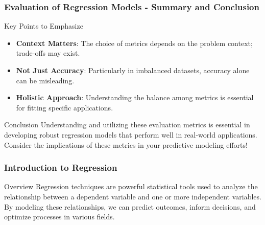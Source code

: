 \documentclass[aspectratio=169]{beamer}
\begin{document}
\begin{frame}[fragile]
    \frametitle{Evaluation of Regression Models - Summary and Conclusion}
    \begin{block}{Key Points to Emphasize}
        \begin{itemize}
            \item \textbf{Context Matters}: The choice of metrics depends on the problem context; trade-offs may exist.
            \item \textbf{Not Just Accuracy}: Particularly in imbalanced datasets, accuracy alone can be misleading. 
            \item \textbf{Holistic Approach}: Understanding the balance among metrics is essential for fitting specific applications.
        \end{itemize}
    \end{block}

    \begin{block}{Conclusion}
        Understanding and utilizing these evaluation metrics is essential in developing robust regression models that perform well in real-world applications. Consider the implications of these metrics in your predictive modeling efforts!
    \end{block}
\end{frame}

\begin{frame}[fragile]
    \frametitle{Introduction to Regression}
    \begin{block}{Overview}
        Regression techniques are powerful statistical tools used to analyze the relationship between a dependent variable and one or more independent variables. By modeling these relationships, we can predict outcomes, inform decisions, and optimize processes in various fields.
    \end{block}
\end{frame}
\end{document}
